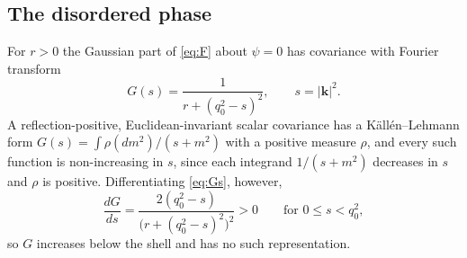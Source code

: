 \documentclass[a4paper,11pt]{article}
\numberwithin{equation}{section}
\theoremstyle{jsplain}
\theoremstyle{jsrem}
\begin{document}
\subsection{The disordered phase}

For $r>0$ the Gaussian part of \eqref{eq:F} about $\psi=0$ has covariance with Fourier transform
\begin{equation}\label{eq:Gs}
G(s)=\frac{1}{r+(q_0^2-s)^2},\qquad s=|\mathbf{k}|^2 .
\end{equation}
A reflection-positive, Euclidean-invariant scalar covariance has a Källén--Lehmann form $G(s)=\int\rho(dm^2)/(s+m^2)$ with a positive measure $\rho$, and every such function is non-increasing in $s$, since each integrand $1/(s+m^2)$ decreases in $s$ and $\rho$ is positive. Differentiating \eqref{eq:Gs}, however,
\[
\frac{dG}{ds}=\frac{2(q_0^2-s)}{\big(r+(q_0^2-s)^2\big)^2}>0\qquad\text{for }0\le s<q_0^2 ,
\]
so $G$ increases below the shell and has no such representation.
\end{document}

